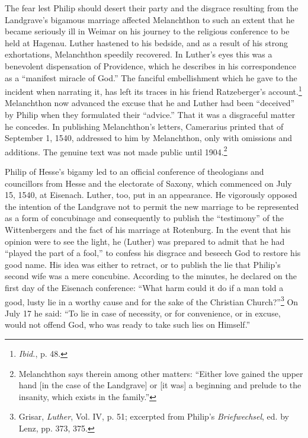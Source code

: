 The fear lest Philip should desert their party and the disgrace resulting
from the Landgrave’s bigamous marriage affected Melanchthon to such an
extent that he became seriously ill in Weimar on
his journey to the religious conference to be held at Hagenau. Luther
hastened to his bedside, and as a result of his strong exhortations,
Melanchthon speedily recovered. In Luther’s eyes this was a benevolent
dispensation of Providence, which he describes in his correspondence
as a “manifest miracle of God.” The fanciful embellishment which
he gave to the incident when narrating it, has left its traces in his
friend Ratzeberger’s account.\footnote{\textit{Ibid.}, p. 48.}
Melanchthon now advanced the excuse
that he and Luther had been “deceived” by Philip when they
formulated their “advice.” That it was a disgraceful matter he concedes.
In publishing Melanchthon’s letters, Camerarius printed that
of September 1, 1540, addressed to him by Melanchthon, only with
omissions and additions. The genuine text was not made public
until 1904.\footnote
{Melanchthon says therein among other matters: “Either love gained the upper hand
[in the case of the Landgrave] or [it was] a beginning and prelude to the insanity, which
exists in the family.”}

Philip of Hesse’s bigamy led to an official conference of theologians
and councillors from Hesse and the electorate of Saxony,
which commenced on July 15, 1540, at Eisenach. Luther, too, put in
an appearance. He vigorously opposed the intention of the Landgrave
not to permit the new marriage to be represented as a form of concubinage
and consequently to publish the “testimony” of the Wittenbergers and the
fact of his marriage at Rotenburg. In the event that his
opinion were to see the light, he (Luther) was prepared to admit that
he had “played the part of a fool,” to confess his disgrace and beseech
God to restore his good name. His idea was either to retract, or
to publish the lie that Philip’s second wife was a mere concubine. According
to the minutes, he declared on the first day of the Eisenach
conference: “What harm could it do if a man told a good, lusty lie
in a worthy cause and for the sake of the Christian Church?”\footnote
{Grisar, \textit{Luther}, Vol. IV, p. 51; excerpted from Philip’s \textit{Briefwechsel}, ed. by Lenz, pp.
373, 375.}
On July 17 he said: “To lie in case of necessity, or for convenience, or in
excuse, would not offend God, who was ready to take such lies on
Himself.”

